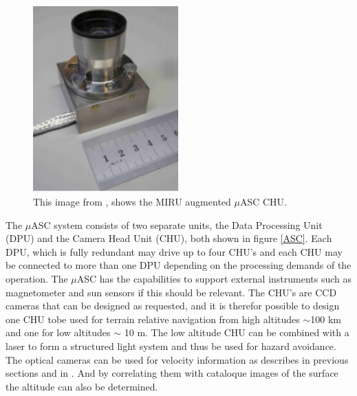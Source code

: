 \begin{figure}
\begin{center}
\includegraphics[width=0.5\textwidth]{figures/chumiro.eps}
\caption{This image from \cite{mirosheet}, shows the MIRU augmented $\mu$ASC CHU.}
\label{miruasc}
\end{center}
\end{figure}

The $\mu$ASC system consists of two separate units, the Data Processing Unit (DPU) and the Camera Head Unit (CHU),  both shown in figure \ref{ASC}. Each DPU, which is fully redundant may drive up to four CHU's and each CHU may be connected to more than one DPU depending on the processing demands of the operation. The $\mu$ASC has the capabilities to support external instruments such as magnetometer and sun sensors if this should be relevant. The CHU's are CCD cameras that can be designed as requested, and it is therefor possible to design one CHU tobe used for terrain relative navigation from high altitudes $\sim$100 km and one for low altitudes $\sim$ 10 m. The low altitude CHU can be combined with a laser to form a structured light system and thus be used for hazard avoidance. The optical cameras can be used for velocity information as describes in previous sections and in \citep{alessandro}. And by correlating them with cataloque images of the surface the altitude can also be determined. 


